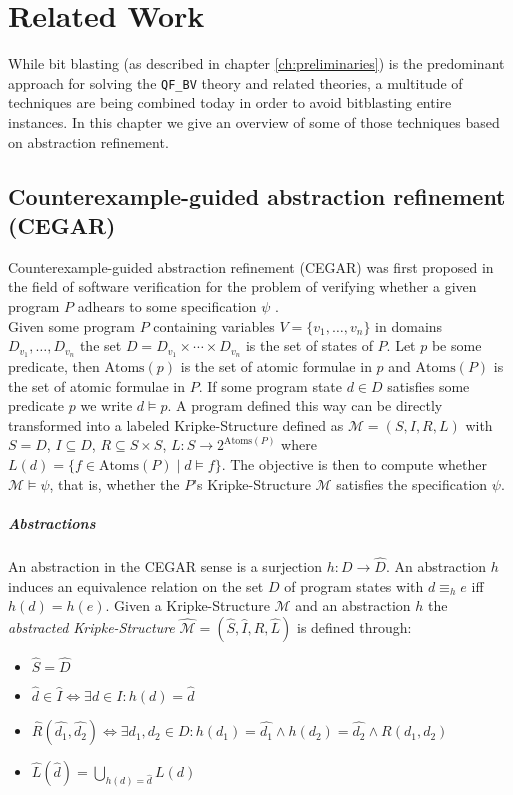 \chapter{Related Work}
\label{ch:related_work}
While bit blasting (as described in chapter \ref{ch:preliminaries}) is the predominant approach for solving the \texttt{QF\_BV} theory and related theories, a multitude of techniques are being combined today in order to avoid bitblasting entire instances.
In this chapter we give an overview of some of those techniques based on abstraction refinement.

\section{Counterexample-guided abstraction refinement (CEGAR)}
Counterexample-guided abstraction refinement (CEGAR) was first proposed in the field of software verification for the problem of verifying whether a given program $P$ adhears to some specification $\psi$ \cite{CEGAR}.\\
Given some program $P$ containing variables $V=\{v_1,\dots,v_n\}$ in domains $D_{v_1},\dots,D_{v_n}$ the set $D=D_{v_1}\times\dotsi\times D_{v_n}$ is the set of states of $P$. Let $p$ be some predicate, then $\text{Atoms}\left(p\right)$ is the set of atomic formulae in $p$ and $\text{Atoms}\left(P\right)$ is the set of atomic formulae in $P$. If some program state $d\in D$ satisfies some predicate $p$ we write $d\vDash p$. A program defined this way can be directly transformed into a labeled Kripke-Structure defined as $\mathcal{M}=\left(S,I,R,L\right)$ with $S=D$, $I\subseteq D$, $R \subseteq S \times S$, $L\colon S \to 2^{\text{Atoms}\left(P\right)}$ where $L\left(d\right) = \{ f \in \text{Atoms}\left(P\right) \mid d \vDash f \}$. The objective is then to compute whether $\mathcal{M}\vDash\psi$, that is, whether the $P$'s Kripke-Structure $\mathcal{M}$ satisfies the specification $\psi$.
\paragraph{Abstractions}
An abstraction in the CEGAR sense is a surjection $h\colon D \to \hat{D}$. An abstraction $h$ induces an equivalence relation on the set $D$ of program states with $d \equiv_h e$ iff $h\left(d\right) = h\left(e\right)$. Given a Kripke-Structure $\mathcal{M}$ and an abstraction $h$ the \textit{abstracted Kripke-Structure} $\hat{\mathcal{M}} = \left(\hat{S},\hat{I},\hat{R},\hat{L}\right)$ is defined through:
\begin{itemize}
    \item $\hat{S} = \hat{D}$
    \item $\hat{d} \in \hat{I} \iff \exists d \in I\colon h\left(d\right) = \hat{d}$
    \item $\hat{R}\left(\hat{d_1},\hat{d_2}\right) \iff \exists d_1,d_2 \in D\colon h\left(d_1\right) = \hat{d_1} \land h\left(d_2\right) = \hat{d_2} \land R\left(d_1, d_2\right)$
    \item $\hat{L}\left(\hat{d}\right)=\bigcup\limits_{h\left(d\right)=\hat{d}} L\left(d\right)$
\end{itemize}


